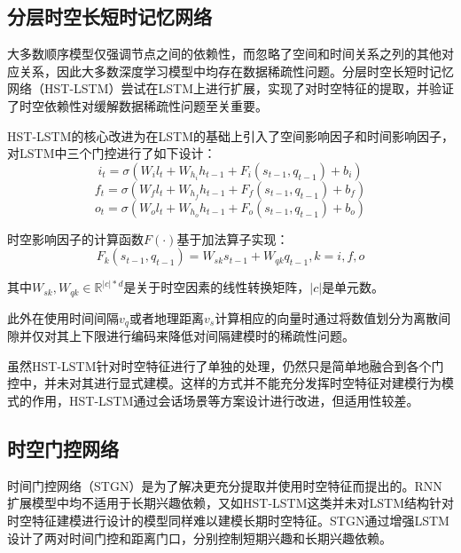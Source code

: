 \documentclass[master]{thesis-uestc}
\begin{document}
\subsection{分层时空长短时记忆网络}
大多数顺序模型仅强调节点之间的依赖性，而忽略了空间和时间关系之列的其他对应关系，因此大多数深度学习模型中均存在数据稀疏性问题。分层时空长短时记忆网络（HST-LSTM）尝试在LSTM上进行扩展，实现了对时空特征的提取，并验证了时空依赖性对缓解数据稀疏性问题至关重要。

HST-LSTM的核心改进为在LSTM的基础上引入了空间影响因子和时间影响因子，对LSTM中三个门控进行了如下设计：
\begin{equation}
   i_t= \sigma(W_{i}l_t + W_{h_i}h_{t-1} + F_i(s_{t-1}, q_{t-1}) + b_i)
\end{equation}
\begin{equation}
   f_t= \sigma(W_{f}l_t + W_{h_f}h_{t-1} + F_f(s_{t-1}, q_{t-1}) + b_f)
\end{equation}
\begin{equation}
   o_t= \sigma(W_{o}l_t + W_{h_o}h_{t-1} + F_o(s_{t-1}, q_{t-1}) + b_o)
\end{equation}

时空影响因子的计算函数$F(\cdot)$基于加法算子实现：
\begin{equation}
   F_k(s_{t-1},q_{t-1})=W_{sk}s_{t-1} + W_{qk}q_{t-1},k=i,f,o
\end{equation}

其中$W_{sk},W_{qk} \in \mathbb{R}^{|c|*d}$是关于时空因素的线性转换矩阵，$|c|$是单元数。

此外在使用时间间隔$v_q$或者地理距离$v_s$计算相应的向量时通过将数值划分为离散间隙并仅对其上下限进行编码来降低对间隔建模时的稀疏性问题。

虽然HST-LSTM针对时空特征进行了单独的处理，仍然只是简单地融合到各个门控中，并未对其进行显式建模。这样的方式并不能充分发挥时空特征对建模行为模式的作用，HST-LSTM通过会话场景等方案设计进行改进，但适用性较差。

\subsection{时空门控网络}
时间门控网络（STGN）是为了解决更充分提取并使用时空特征而提出的。RNN扩展模型中均不适用于长期兴趣依赖，又如HST-LSTM这类并未对LSTM结构针对时空特征建模进行设计的模型同样难以建模长期时空特征。STGN通过增强LSTM设计了两对时间门控和距离门口，分别控制短期兴趣和长期兴趣依赖。
\end{document}
